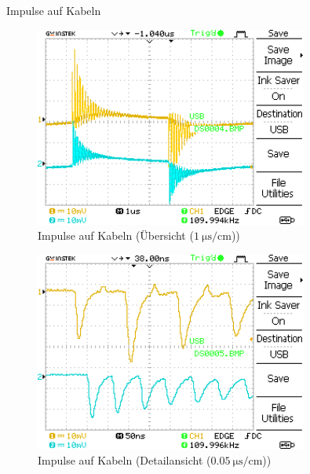 \documentclass[ngerman]{scrartcl}
\theoremstyle{definition}
\begin{document}
\begin{aufgabe}{Impulse auf Kabeln}
\begin{figure}[H]
				\includegraphics[width=0.8\textwidth]{MesswerteVersuch1/DS0004.png}
				\caption{Impulse auf Kabeln (Übersicht ($\SI{1}{\micro\second\per\centi\meter}$))}
				\label{fig:DS0004}
			\end{figure}
			\begin{figure}[H]
				\centering
				\includegraphics[width=0.8\textwidth]{MesswerteVersuch1/DS0005.png}
				\caption{Impulse auf Kabeln (Detailansicht ($\SI{0.05}{\micro\second\per\centi\meter}$))}
				\label{fig:DS0005}
			\end{figure}
		
			
		\end{aufgabe}
\clearpage
\end{document}
